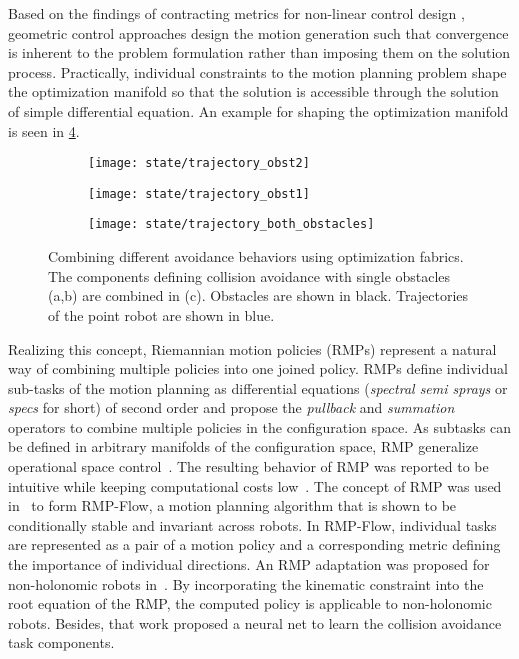 Based on the findings of contracting metrics for non-linear
control design \cite{l2,l3}, geometric control approaches design the motion
generation such that convergence is inherent to the problem formulation
rather than imposing them on the solution process. Practically, individual
constraints to the motion planning problem shape the optimization manifold
so that the solution is accessible through the solution of simple differential
equation. An example for shaping the optimization
manifold is seen in \cref{fig:spec_combination}.

%
\begin{figure}[h]
  \centering
  \begin{subfigure}{0.33\linewidth}
    \centering
    \texttt{[image: state/trajectory\_obst2]}
    \caption{}
    \label{subfig:trajectory_obst1}
  \end{subfigure}%
  \begin{subfigure}{0.33\linewidth}
    \centering
    \texttt{[image: state/trajectory\_obst1]}
    \caption{}
    \label{subfig:trajectory_obst2}
  \end{subfigure}%
  \begin{subfigure}{0.33\linewidth}
    \centering
    \texttt{[image: state/trajectory\_both\_obstacles]}
    \caption{}
    \label{subfig:trajectory_both_obstacles}
  \end{subfigure}
  \caption{
    Combining different avoidance behaviors using optimization fabrics. The
    components defining collision avoidance with single obstacles (a,b) are
    combined in (c). Obstacles are shown in black. Trajectories of the point
    robot are shown in blue.
  }
  \label{fig:spec_combination}
\end{figure}
%
Realizing this concept, Riemannian motion policies (RMPs) represent a
natural way of combining multiple policies into one joined policy.
RMPs define individual sub-tasks of the motion planning as
differential equations (\textit{spectral semi sprays} or
\textit{specs} for short) of second order and propose the
\textit{pullback} and \textit{summation} operators to combine multiple policies
in the configuration space. As subtasks can be defined in arbitrary manifolds
of the configuration space, RMP generalize operational space
control~\cite{Khatib1987}. The resulting behavior of RMP was reported to be
intuitive while keeping computational costs low~\cite{Ratliff2018}. The concept
of RMP was used in~\cite{Cheng2018,Cheng2020} to form RMP-Flow, a motion
planning algorithm that is shown to be conditionally stable and invariant
across robots. In RMP-Flow, individual tasks are represented as a pair of
a motion policy and a corresponding metric defining the importance of
individual directions. An RMP adaptation was proposed for non-holonomic robots
in~\cite{Meng2019}. By incorporating the kinematic constraint into the root
equation of the RMP, the computed policy is applicable to non-holonomic robots.
Besides, that work proposed a neural net to learn the collision avoidance task
components. 

